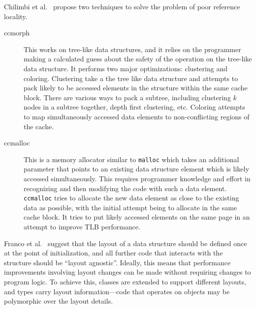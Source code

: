 Chilimbi et al.~\cite{CSL} propose two techniques to solve the problem of poor reference locality.
\begin{description}
\item[ccmorph] This works on tree-like data structures, and it relies on the programmer making a calculated guess about the safety of the operation on the tree-like data structure. It performs two major optimizations: clustering and coloring. Clustering take a the tree like data structure and attempts to pack likely to be accessed elements in the structure within the same cache block. There are various ways to pack a subtree, including clustering $k$ nodes in a subtree together, depth first clustering, etc.
Coloring attempts to map simultaneously accessed data elements to non-conflicting regions of the cache.
\item[ccmalloc] This is a memory allocator similar to \texttt{malloc} which takes an additional parameter that points to an existing data structure element which is likely accessed simultaneously. This requires programmer knowledge and effort in recognizing and then modifying the code with such a data element. \texttt{ccmalloc} tries to allocate the new data element as close to the existing data as possible, with the initial attempt being to allocate in the same cache block. It tries to put likely accessed elements on the same page in an attempt to improve TLB performance.
\end{description}

Franco et al.~\cite{Shapes, Shapes2} suggest
that the layout of a data structure should be defined once at the point of initialization, and all further code that interacts with the structure should be ``layout agnostic''. Ideally, this means that performance improvements involving layout changes can be made without requiring changes to program logic. To achieve this, classes are extended to support different layouts, and types carry layout information---code that operates on objects may be polymorphic over the layout details.

